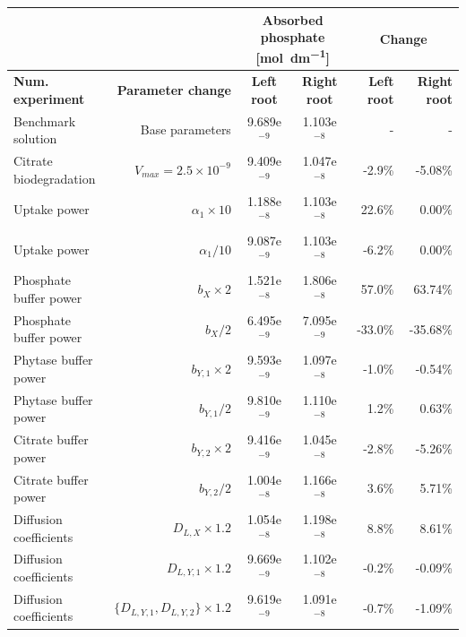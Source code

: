 \documentclass[11pt]{article}
\numberwithin{equation}{section}
\begin{document}

\begin{table}[h]
\begin{center}

\fontsize{9.5}{7}\selectfont
\setlength{\tabcolsep}{5.pt}
\def\arraystretch{1.5}
\begin{tabular}{lrccrr}
\toprule
 & & \multicolumn{2}{c}{\textbf{Absorbed phosphate [\si{mol .dm^{-1}}]}} & \multicolumn{2}{c}{\textbf{Change}} \\
 \hline
  \textbf{Num. experiment} & \textbf{Parameter change} & \textbf{Left root} & \textbf{Right root} & \textbf{Left root}  & \textbf{Right root}\\
 \hline 
Benchmark solution & Base parameters & 9.689e$^{-9}$ &  1.103e$^{-8}$& - &- \\
Citrate biodegradation & $V_{max}=2.5 \times 10^{-9}$ & 9.409e$^{-9}$ & 1.047e$^{-8}$ & -2.9\% & -5.08\%\\
Uptake power& $\alpha_1 \times 10$ & 1.188e$^{-8}$ & 1.103e$^{-8}$ & 22.6\% & 0.00\% \\
Uptake power & $\alpha_1 / 10$  & 9.087e$^{-9}$ & 1.103e$^{-8}$ & -6.2\% & 0.00\% \\
Phosphate buffer power & $b_X \times 2$ & 1.521e$^{-8}$ & 1.806e$^{-8}$ & 57.0\% & 63.74\% \\
Phosphate buffer power & $b_X / 2$  & 6.495e$^{-9}$ & 7.095e$^{-9}$ & -33.0\% & -35.68\% \\
Phytase buffer power & $b_{Y,1} \times 2$ &  9.593e$^{-9}$ & 1.097e$^{-8}$ & -1.0\% & -0.54\%  \\
Phytase buffer power & $b_{Y,1} / 2$ & 9.810e$^{-9}$ & 1.110e$^{-8}$ & 1.2\% & 0.63\%   \\
Citrate buffer power & $b_{Y,2} \times 2$ &  9.416e$^{-9}$ & 1.045e$^{-8}$ & -2.8\% & -5.26\% \\
Citrate buffer power & $b_{Y,2} / 2$ & 1.004e$^{-8}$ & 1.166e$^{-8}$ & 3.6\% & 5.71\% \\
Diffusion coefficients & $D_{L,X}\times 1.2$ &  1.054e$^{-8}$ & 1.198e$^{-8}$ & 8.8\% & 8.61\% \\
Diffusion coefficients & $D_{L,Y,1}\times 1.2$ & 9.669e$^{-9}$ & 1.102e$^{-8}$ & -0.2\% & -0.09\% \\
Diffusion coefficients & $\{D_{L,Y,1}, D_{L,Y,2} \}\times 1.2$ & 9.619e$^{-9}$& 1.091e$^{-8}$ & -0.7\% & -1.09\% \\

\end{tabular}
\end{center}
\end{table}
\end{document}
